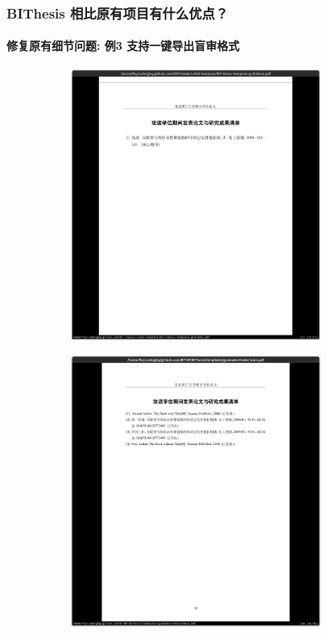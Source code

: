 \documentclass[
  aspectratio=169,
  presentation,
  titlegraphic=./images/bit.png,
  framelogo=./images/bit.png
]{bitbeamer}
\begin{document}
\begin{frame}[t]
\begin{figure}
\begin{subfigure}{0.45\textwidth}
    \end{subfigure}
  \end{figure}
\end{frame}

\begin{frame}[t]
  \frametitle{BIThesis 相比原有项目有什么优点？}
  \framesubtitle{修复原有细节问题: 例3 支持一键导出盲审格式}

  \vspace{-0.8cm}

  \begin{figure}
    \begin{subfigure}{0.45\textwidth}
      \includegraphics[width=0.9\textwidth]{images/7-1.png}
    \end{subfigure}
    \begin{subfigure}{0.45\textwidth}
      \includegraphics[width=0.9\textwidth]{images/7-2.png}

\end{subfigure}
\end{figure}
\end{frame}
\end{document}
